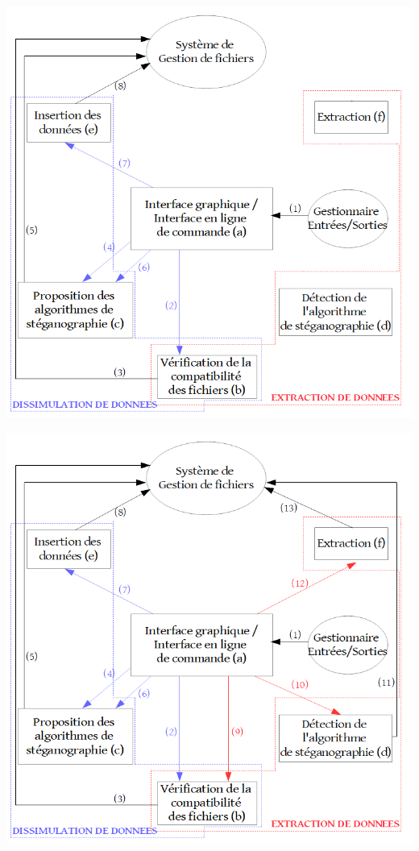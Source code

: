 \documentclass{beamer}
\begin{document}
  \begin{frame}
  \hspace{1.5cm}
  \includegraphics[scale=0.35]{pictures/organigramme_insertion.png}
  \end{frame}
  
  \begin{frame}
  \hspace{1.5cm}
  \includegraphics[scale=0.25]{pictures/organigramme_extraction.png}
  \end{frame}
  
\end{document}
